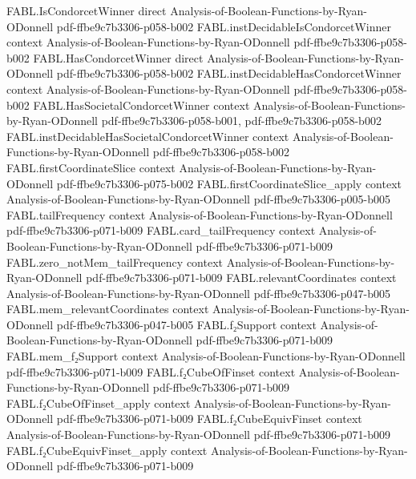 \begin{theorem}
\proofstep
  {FABL.IsCondorcetWinner}
  {direct}
  {Analysis-of-Boolean-Functions-by-Ryan-ODonnell}
  {pdf-ffbe9c7b3306-p058-b002}
\proofstep
  {FABL.instDecidableIsCondorcetWinner}
  {context}
  {Analysis-of-Boolean-Functions-by-Ryan-ODonnell}
  {pdf-ffbe9c7b3306-p058-b002}
\proofstep
  {FABL.HasCondorcetWinner}
  {direct}
  {Analysis-of-Boolean-Functions-by-Ryan-ODonnell}
  {pdf-ffbe9c7b3306-p058-b002}
\proofstep
  {FABL.instDecidableHasCondorcetWinner}
  {context}
  {Analysis-of-Boolean-Functions-by-Ryan-ODonnell}
  {pdf-ffbe9c7b3306-p058-b002}
\proofstep
  {FABL.HasSocietalCondorcetWinner}
  {context}
  {Analysis-of-Boolean-Functions-by-Ryan-ODonnell}
  {pdf-ffbe9c7b3306-p058-b001,
    pdf-ffbe9c7b3306-p058-b002}
\proofstep
  {FABL.instDecidableHasSocietalCondorcetWinner}
  {context}
  {Analysis-of-Boolean-Functions-by-Ryan-ODonnell}
  {pdf-ffbe9c7b3306-p058-b002}
\proofstep
  {FABL.firstCoordinateSlice}
  {context}
  {Analysis-of-Boolean-Functions-by-Ryan-ODonnell}
  {pdf-ffbe9c7b3306-p075-b002}
\proofstep
  {FABL.firstCoordinateSlice_apply}
  {context}
  {Analysis-of-Boolean-Functions-by-Ryan-ODonnell}
  {pdf-ffbe9c7b3306-p005-b005}
\proofstep
  {FABL.tailFrequency}
  {context}
  {Analysis-of-Boolean-Functions-by-Ryan-ODonnell}
  {pdf-ffbe9c7b3306-p071-b009}
\proofstep
  {FABL.card_tailFrequency}
  {context}
  {Analysis-of-Boolean-Functions-by-Ryan-ODonnell}
  {pdf-ffbe9c7b3306-p071-b009}
\proofstep
  {FABL.zero_notMem_tailFrequency}
  {context}
  {Analysis-of-Boolean-Functions-by-Ryan-ODonnell}
  {pdf-ffbe9c7b3306-p071-b009}
\proofstep
  {FABL.relevantCoordinates}
  {context}
  {Analysis-of-Boolean-Functions-by-Ryan-ODonnell}
  {pdf-ffbe9c7b3306-p047-b005}
\proofstep
  {FABL.mem_relevantCoordinates}
  {context}
  {Analysis-of-Boolean-Functions-by-Ryan-ODonnell}
  {pdf-ffbe9c7b3306-p047-b005}
\proofstep
  {FABL.f₂Support}
  {context}
  {Analysis-of-Boolean-Functions-by-Ryan-ODonnell}
  {pdf-ffbe9c7b3306-p071-b009}
\proofstep
  {FABL.mem_f₂Support}
  {context}
  {Analysis-of-Boolean-Functions-by-Ryan-ODonnell}
  {pdf-ffbe9c7b3306-p071-b009}
\proofstep
  {FABL.f₂CubeOfFinset}
  {context}
  {Analysis-of-Boolean-Functions-by-Ryan-ODonnell}
  {pdf-ffbe9c7b3306-p071-b009}
\proofstep
  {FABL.f₂CubeOfFinset_apply}
  {context}
  {Analysis-of-Boolean-Functions-by-Ryan-ODonnell}
  {pdf-ffbe9c7b3306-p071-b009}
\proofstep
  {FABL.f₂CubeEquivFinset}
  {context}
  {Analysis-of-Boolean-Functions-by-Ryan-ODonnell}
  {pdf-ffbe9c7b3306-p071-b009}
\proofstep
  {FABL.f₂CubeEquivFinset_apply}
  {context}
  {Analysis-of-Boolean-Functions-by-Ryan-ODonnell}
  {pdf-ffbe9c7b3306-p071-b009}

\end{theorem}
